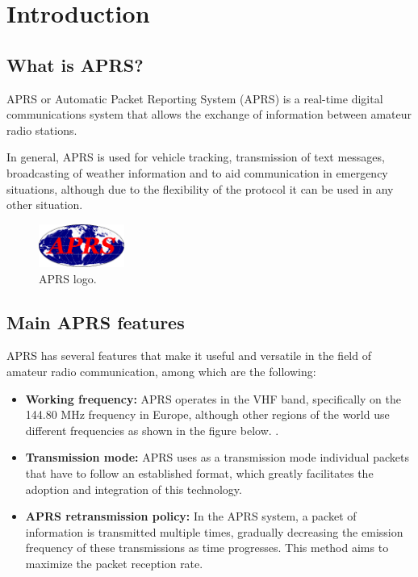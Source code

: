 \chapter*{Introduction}
\label{cap:introduction}

\section{What is APRS?}

APRS or Automatic Packet Reporting System (APRS) is a real-time digital communications system that allows the exchange of information between amateur radio stations.

In general, APRS is used for vehicle tracking, transmission of text messages, broadcasting of weather information and to aid communication in emergency situations, although due to the flexibility of the protocol it can be used in any other situation.

\begin{figure}[h!]
	\centering
	\includegraphics[width=0.25\textwidth]{Imagenes/Chapter_1/APRS_logo.png}
	\caption{APRS logo.}
	\label{fig:aprs-logo-en}
\end{figure}

\section{Main APRS features}

APRS has several features that make it useful and versatile in the field of amateur radio communication, among which are the following:
\begin{itemize}
	\item \textbf{Working frequency:} APRS operates in the VHF band, specifically on the 144.80 MHz frequency in Europe, although other regions of the world use different frequencies as shown in the figure below. .
	\item \textbf{Transmission mode:} APRS uses as a transmission mode individual packets that have to follow an established format, which greatly facilitates the adoption and integration of this technology.
	\item \textbf{APRS retransmission policy:} In the APRS system, a packet of information is transmitted multiple times, gradually decreasing the emission frequency of these transmissions as time progresses. This method aims to maximize the packet reception rate.
\end{itemize}

